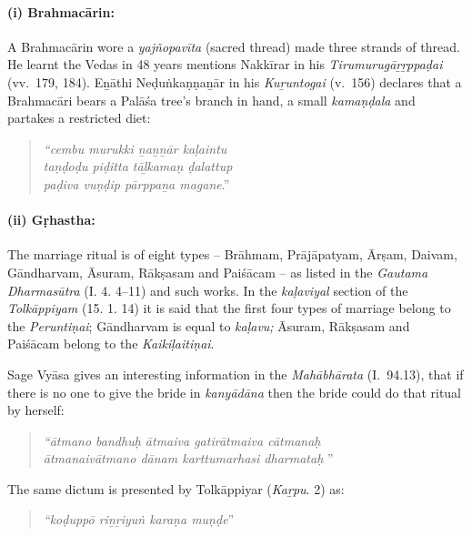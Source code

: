 \paragraph*{(i) Brahmacārin:}

\vskip -7pt

A Brahmacārin wore a \textit{yajñopavīta} (sacred thread) made three strands of thread. He learnt the Vedas in 48 years mentions Nakkīrar in his \textit{Tirumurugāṟṟppaḍai} (vv.~179, 184). Eṉāthi Neḍuṅkaṇṇaṉār in his \textit{Kuṟuntogai} (v.~156) declares that a Brahmacāri bears a Palāśa tree's branch in hand, a small \textit{kamaṇḍala} and partakes a restricted diet:

\begin{quote}
\textit{“cembu murukki ṉaṉṉār kaḷaintu}\\\textit{taṇḍoḍu piḍitta tāḻkamaṇ ḍalattup}\\\textit{paḍiva vuṇḍip pārppaṉa magane}.”
\end{quote}


\paragraph*{(ii) Gṛhastha:}

\vskip -7pt

The marriage ritual is of eight types – Brāhmam, Prājāpatyam, Ārṣam, Daivam, Gāndharvam, Āsuram, Rākṣasam and Paiśācam – as listed in the \textit{Gautama Dharmasūtra} (I. 4. 4–11) and such works. In the \textit{kaḷaviyal} section of the \textit{Tolkāppiyam} (15. 1. 14) it is said that the first four types of marriage belong to the \textit{Peruntiṇai}; Gāndharvam is equal to \textit{kaḷavu;} Āsuram, Rākṣasam and Paiśācam belong to the \textit{Kaikiḷaitiṇai}.

Sage Vyāsa gives an interesting information in the \textit{Mahābhārata} (I.~94.13), that if there is no one to give the bride in \textit{kanyādāna} then the bride could do that ritual by herself:

\begin{quote}
\textit{“ātmano bandhuḥ ātmaiva gatirātmaiva cātmanaḥ}\\\textit{ātmanaivātmano dānam karttumarhasi dharmataḥ }”
\end{quote}

The same dictum is presented by Tolkāppiyar (\textit{Kaṟpu}. 2) as:

\begin{quote}
\textit{“koḍuppō riṉṟiyuṅ karaṇa muṇḍe}”
\end{quote}

